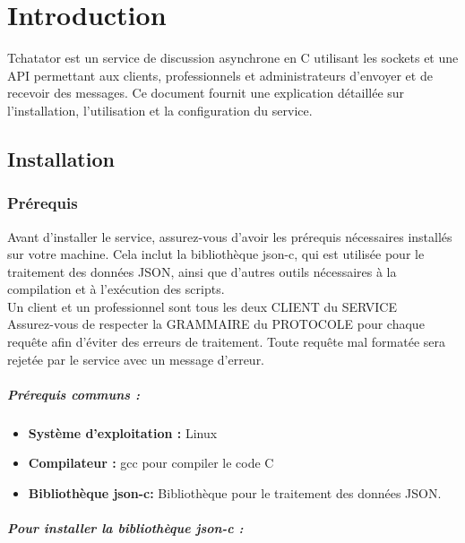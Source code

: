 \documentclass{report}
\begin{document}
\tableofcontents
\newpage

\chapter{Introduction}

Tchatator est un service de discussion asynchrone en C utilisant les sockets et une API permettant aux clients, professionnels et administrateurs d'envoyer et de recevoir des messages. Ce document fournit une explication détaillée sur l'installation, l'utilisation et la configuration du service.

\section{Installation}

\subsection{Prérequis}

Avant d'installer le service, assurez-vous d'avoir les prérequis nécessaires installés sur votre machine. Cela inclut la bibliothèque json-c, qui est utilisée pour le traitement des données JSON, ainsi que d'autres outils nécessaires à la compilation et à l'exécution des scripts. \\

Un client et un professionnel sont tous les deux CLIENT du SERVICE \\

Assurez-vous de respecter la GRAMMAIRE du  PROTOCOLE pour chaque requête afin d'éviter des erreurs de traitement. Toute requête mal formatée sera rejetée par le service avec un message d'erreur.

\paragraph{Prérequis communs :}
\begin{itemize}

	\item \textbf{Système d'exploitation :}  Linux
	\item \textbf{Compilateur :}  gcc pour compiler le code C
	\item \textbf{Bibliothèque json-c:} Bibliothèque pour le traitement des données JSON.

\end{itemize}

\paragraph{Pour installer la bibliothèque json-c :}
\end{document}
